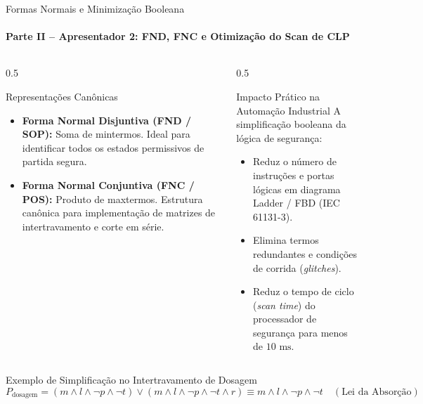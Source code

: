 \documentclass[aspectratio=169, 10pt]{beamer}
\begin{document}
\begin{frame}{Formas Normais e Minimização Booleana}
  \framesubtitle{Parte II -- Apresentador 2: FND, FNC e Otimização do Scan de CLP}
  \begin{columns}
    \begin{column}{0.5\textwidth}
      \begin{block}{Representações Canônicas}
        \begin{itemize}
          \item \textbf{Forma Normal Disjuntiva (FND / SOP):}
          Soma de mintermos. Ideal para identificar todos os estados permissivos de partida segura.
          \item \textbf{Forma Normal Conjuntiva (FNC / POS):}
          Produto de maxtermos. Estrutura canônica para implementação de matrizes de intertravamento e corte em série.
        \end{itemize}
      \end{block}
    \end{column}

    \begin{column}{0.5\textwidth}
      \begin{block}{Impacto Prático na Automação Industrial}
        A simplificação booleana da lógica de segurança:
        \begin{itemize}
          \item Reduz o número de instruções e portas lógicas em diagrama Ladder / FBD (IEC 61131-3).
          \item Elimina termos redundantes e condições de corrida (\textit{glitches}).
          \item Reduz o tempo de ciclo (\textit{scan time}) do processador de segurança para menos de $10\text{ ms}$.
        \end{itemize}
      \end{block}
    \end{column}
  \end{columns}

  \vspace{0.2cm}
  \begin{exampleblock}{Exemplo de Simplificação no Intertravamento de Dosagem}
    $$P_{\text{dosagem}} = (m \land l \land \neg p \land \neg t) \lor (m \land l \land \neg p \land \neg t \land r) \equiv m \land l \land \neg p \land \neg t \quad (\text{Lei da Absorção})$$
  \end{exampleblock}
\end{frame}
\end{document}
